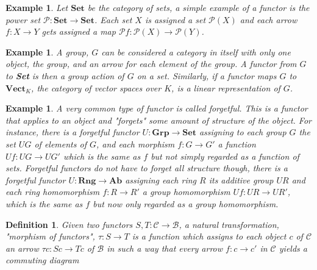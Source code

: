 \documentclass[12pt,a4paper]{article}
\newtheorem{example}[theorem]{Example}
\newtheorem{definition}[theorem]{Definition}
\newcommand\BB{\mathcal{B}}
\newcommand\CC{\mathcal{C}}
\newcommand\PP{\mathcal{P}}
\begin{document}
\begin{example}
    Let $\textbf{Set}$ be the category of sets, a simple example of a functor is the power set $\PP:\textbf{Set}\to\textbf{Set}$.
    Each set $X$ is assigned a set $\PP(X)$ and each arrow $f:X\to Y$ gets assigned a map $\PP f:\PP(X)\to\PP(Y)$.
\end{example}

\begin{example}
    A group, $G$ can be considered a category in itself with only one object, the group, and an arrow for each element of the group.
    A functor from $G$ to \textbf{Set} is then a group action of $G$ on a set.
    Similarly, if a functor maps $G$ to $\textbf{Vect}_K$, the category of vector spaces over $K$, is a linear representation of $G$.
\end{example}

\begin{example}
    A very common type of functor is called \textit{forgetful}.
    This is a functor that applies to an object and "forgets" some amount of structure of the object.
    For instance, there is a forgetful functor $U:\textbf{Grp}\to\textbf{Set}$ assigning to each group $G$ the set $UG$ of elements of $G$, and each morphism $f:G\to G'$ a function $Uf:UG\to UG'$ which is the same as $f$ but not simply regarded as a function of sets.
    Forgetful functors do not have to forget all structure though, there is a forgetful functor $U:\textbf{Rng}\to \textbf{Ab}$ assigning each ring $R$ its additive group $UR$ and each ring homomorphism $f:R\to R'$ a group homomorphism $Uf:UR\to UR'$, which is the same as $f$ but now only regarded as a group homomorphism.
\end{example}

\begin{definition}
    Given two functors $S,T:\CC\to\BB$, a \textit{natural transformation}, "morphism of functors", $\tau:S\to T$ is a function which assigns to each object $c$ of $\CC$ an arrow $\tau c:Sc\to Tc$ of $\BB$ in such a way that every arrow $f:c\to c'$ in $\CC$ yields a commuting diagram\\
    \begin{center}
    \end{center}
\end{definition}
\end{document}
